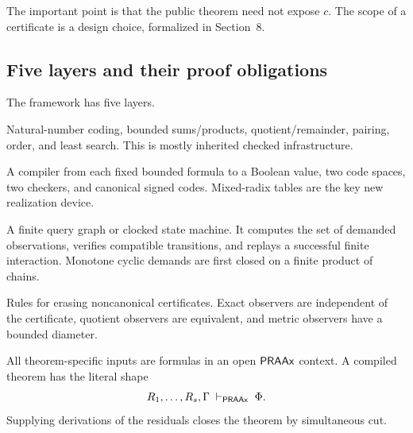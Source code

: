 The important point is that the public theorem need not expose \(c\).  The
scope of a certificate is a design choice, formalized in Section~8.

\subsection{Five layers and their proof obligations}

The framework has five layers.

\begin{description}[leftmargin=2.3cm,style=nextline]
\item[Arithmetic layer]
Natural-number coding, bounded sums/products, quotient/remainder, pairing,
order, and least search.  This is mostly inherited checked infrastructure.

\item[Strategy layer]
A compiler from each fixed bounded formula to a Boolean value, two code spaces,
two checkers, and canonical signed codes.  Mixed-radix tables are the key new
realization device.

\item[Interaction layer]
A finite query graph or clocked state machine.  It computes the set of demanded
observations, verifies compatible transitions, and replays a successful finite
interaction.  Monotone cyclic demands are first closed on a finite product of
chains.

\item[Observation layer]
Rules for erasing noncanonical certificates.  Exact observers are independent
of the certificate, quotient observers are equivalent, and metric observers
have a bounded diameter.

\item[Boundary layer]
All theorem-specific inputs are formulas in an open \(\mathsf{PRAAx}\) context.  A
compiled theorem has the literal shape
\[
  R_1,\ldots,R_s,\Gamma\;\vdash_{\mathsf{PRAAx}}\;\Phi.
\]
Supplying derivations of the residuals closes the theorem by simultaneous cut.
\end{description}

\begin{center}
\end{center}

